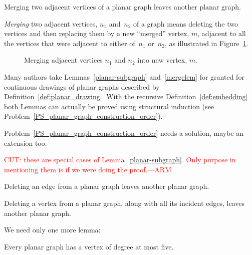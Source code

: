 \begin{lemma}\label{mergelem}
Merging two adjacent vertices of a planar graph leaves another planar
graph.
\end{lemma}

\emph{Merging} two adjacent vertices, $n_1$ and~$n_2$ of a
  graph means deleting the two vertices and then replacing them by a
  new ``merged'' vertex, $m$, adjacent to all the vertices that were
  adjacent to either of~$n_1$ or~$n_2$, as illustrated in
  Figure~\ref{fig:merged}.

\begin{figure}


\caption{Merging adjacent vertices $n_1$ and $n_2$ into new vertex, $m$.}
\label{fig:merged}
\end{figure}

Many authors take Lemmas~\ref{planar-subgraph} and~\ref{mergelem} for
granted for continuous drawings of planar graphs described by
Definition~\ref{def:planar_drawing}.  With the recursive
Definition~\ref{def:embedding} both Lemmas can actually be proved
using structural induction (see
Problem~\ref{PS_planar_graph_construction_order}).

\begin{editingnotes}
Problem~\ref{PS_planar_graph_construction_order} needs a solution,
maybe an extension too.
\end{editingnotes}

\begin{editingnotes}
\textcolor{red}{CUT: these are special cases of
  Lemma~\ref{planar-subgraph}.  Only purpose in mentioning them is if
  we were doing the proof.---ARM}

\begin{lemma*}%
Deleting an edge from a planar graph leaves another planar graph.
\end{lemma*}

\begin{corollary*}%
Deleting a vertex from a planar graph, along with all its incident
edges, leaves another planar graph.
\end{corollary*}
\end{editingnotes}

We need only one more lemma:
\begin{lemma}\label{lem:pg5}
Every planar graph has a vertex of degree at most five.
\end{lemma}

